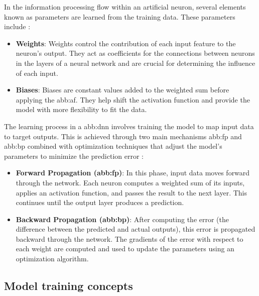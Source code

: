 In the information processing flow within an artificial neuron, several elements known as parameters are learned from the training data. These parameters include \parencite{Kelleher2019}:
\begin{itemize}
    \item \textbf{Weights}: Weights control the contribution of each input feature to the neuron's output. They act as coefficients for the connections between neurons in the layers of a neural network and are crucial for determining the influence of each input.
    
    \item \textbf{Biases}: Biases are constant values added to the weighted sum before applying the \gls{abb:af}. They help shift the activation function and provide the model with more flexibility to fit the data.
\end{itemize}

The learning process in a \gls{abb:dnn} involves training the model to map input data to target outputs. This is achieved through two main mechanisms \gls{abb:fp} and \gls{abb:bp} combined with optimization techniques that adjust the model’s parameters to minimize the prediction error \parencite{Kelleher2019}:
\begin{itemize}
    \item \textbf{Forward Propagation (\gls{abb:fp})}: In this phase, input data moves forward through the network. Each neuron computes a weighted sum of its inputs, applies an activation function, and passes the result to the next layer. This continues until the output layer produces a prediction.

    \item \textbf{Backward Propagation (\gls{abb:bp})}: After computing the error (the difference between the predicted and actual outputs), this error is propagated backward through the network. The gradients of the error with respect to each weight are computed and used to update the parameters using an optimization algorithm.
\end{itemize}




\subsection{Model training concepts}

